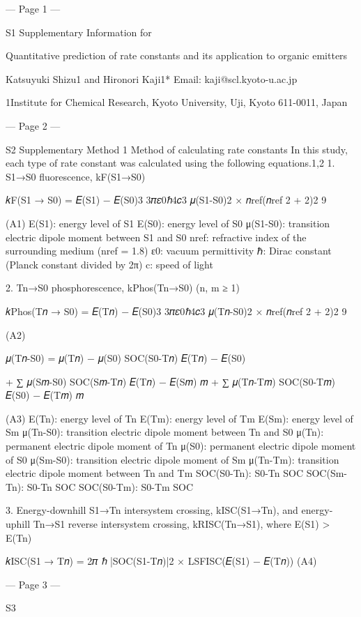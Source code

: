--- Page 1 ---
 
S1 
Supplementary Information for 
 
Quantitative prediction of rate constants and its 
application to organic emitters 
 
Katsuyuki Shizu1 and Hironori Kaji1* 
Email: kaji@scl.kyoto-u.ac.jp 
 
1Institute for Chemical Research, Kyoto University, Uji, Kyoto 611-0011, Japan 
 
 


--- Page 2 ---
 
S2 
Supplementary Method 1 
Method of calculating rate constants 
In this study, each type of rate constant was calculated using the following equations.1,2 
1. S1→S0 fluorescence, kF(S1→S0) 
 
𝑘F(S1 → S0) =
{𝐸(S1) − 𝐸(S0)}3
3𝜋𝜀0ℏ4𝑐3
𝜇(S1-S0)2 × 𝑛ref(𝑛ref
2 + 2)2
9
 
(A1) 
E(S1): energy level of S1 
E(S0): energy level of S0 
μ(S1-S0): transition electric dipole moment between S1 and S0  
nref: refractive index of the surrounding medium (nref = 1.8) 
ε0: vacuum permittivity 
ℏ: Dirac constant (Planck constant divided by 2π) 
c: speed of light 
 
2. Tn→S0 phosphorescence, kPhos(Tn→S0) (n, m ≥ 1) 
 
𝑘Phos(T𝑛 → S0) =
{𝐸(T𝑛) − 𝐸(S0)}3
3𝜋𝜀0ℏ4𝑐3
𝜇(T𝑛-S0)2 × 𝑛ref(𝑛ref
2 + 2)2
9
 
(A2) 
 
𝜇(T𝑛-S0) = {𝜇(T𝑛) − 𝜇(S0)}
SOC(S0-T𝑛)
𝐸(T𝑛) − 𝐸(S0) 
 
 
+ ∑ 𝜇(S𝑚-S0)
SOC(S𝑚-T𝑛)
𝐸(T𝑛) − 𝐸(S𝑚)
𝑚
+ ∑ 𝜇(T𝑛-T𝑚)
SOC(S0-T𝑚)
𝐸(S0) − 𝐸(T𝑚)
𝑚
 
(A3) 
E(Tn): energy level of Tn 
E(Tm): energy level of Tm 
E(Sm): energy level of Sm 
μ(Tn-S0): transition electric dipole moment between Tn and S0 
μ(Tn): permanent electric dipole moment of Tn 
μ(S0): permanent electric dipole moment of S0 
μ(Sm-S0): transition electric dipole moment of Sm 
μ(Tn-Tm): transition electric dipole moment between Tn and Tm 
SOC(S0-Tn): S0-Tn SOC 
SOC(Sm-Tn): S0-Tn SOC 
SOC(S0-Tm): S0-Tm SOC 
 
3. Energy-downhill S1→Tn intersystem crossing, kISC(S1→Tn), and energy-uphill Tn→S1 
reverse intersystem crossing, kRISC(Tn→S1), where E(S1) > E(Tn) 
 
𝑘ISC(S1 → T𝑛) = 2𝜋
ℏ |SOC(S1-T𝑛)|2 × LSFISC(𝐸(S1) − 𝐸(T𝑛)) 
(A4) 


--- Page 3 ---
 
S3 
 
